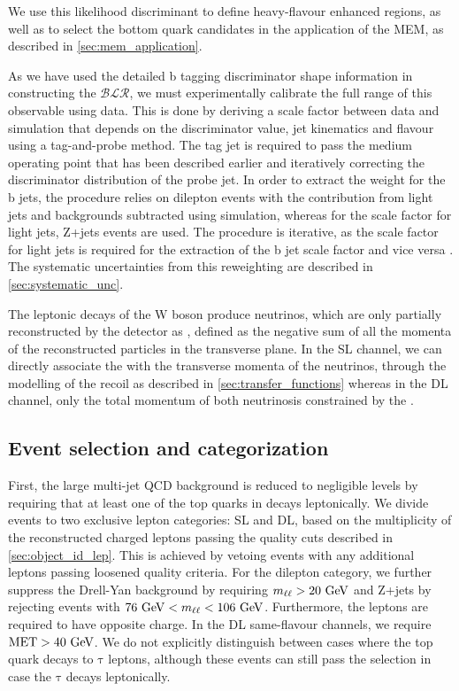 We use this likelihood discriminant to define heavy-flavour enhanced regions, as well as to select the bottom quark candidates in the application of the MEM, as described in \cref{sec:mem_application}. 

As we have used the detailed b tagging discriminator shape information in constructing the $\mathcal{BLR}$, we must experimentally calibrate the full range of this observable using data. This is done by deriving a scale factor between data and simulation that depends on the discriminator value, jet kinematics and flavour using a tag-and-probe method. The tag jet is required to pass the medium operating point that has been described earlier and iteratively correcting the discriminator distribution of the probe jet. In order to extract the weight for the b jets, the procedure relies on dilepton \ttbar events with the contribution from light jets and backgrounds subtracted using simulation, whereas for the scale factor for light jets, Z+jets events are used. The procedure is iterative, as the scale factor for light jets is required for the extraction of the b jet scale factor and vice versa \cite{CMS:2013sea,CMS:2016kkf}. The systematic uncertainties from this reweighting are described in \cref{sec:systematic_unc}.

The leptonic decays of the W boson produce neutrinos, which are only partially reconstructed by the detector as \MET, defined as the negative sum of all the momenta of the reconstructed particles in the transverse plane. In the SL channel, we can directly associate the \MET with the transverse momenta of the neutrinos, through the modelling of the recoil as described in \cref{sec:transfer_functions} whereas in the DL channel, only the total momentum of both neutrinosis  constrained by the \MET.

\subsection{Event selection and categorization}
\label{sec:event_selection}

First, the large multi-jet QCD background is reduced to negligible levels by requiring that at least one of the top quarks in \ttHbb decays leptonically. We divide events to two exclusive lepton categories: SL and DL, based on the multiplicity of the reconstructed charged leptons passing the quality cuts described in \cref{sec:object_id_lep}. This is achieved by vetoing events with any additional leptons passing loosened quality criteria. For the dilepton category, we further suppress the Drell-Yan background by requiring $m_{\ell\ell} > 20~\mathrm{GeV}$ and Z+jets by rejecting events with $76~\mathrm{GeV} < m_{\ell\ell} < 106~\mathrm{GeV}$. Furthermore, the leptons are required to have opposite charge. In the DL same-flavour channels, we require $\mathrm{MET} > 40~\mathrm{GeV}$. We do not explicitly distinguish between cases where the top quark decays to $\mathrm{\tau}$ leptons, although these events can still pass the selection in case the $\mathrm{\tau}$ decays leptonically.

